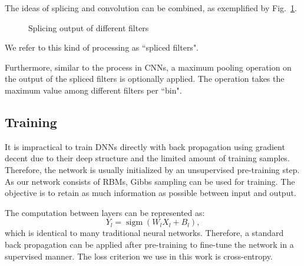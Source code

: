 \documentclass{article}
\DeclareMathOperator*{\sigm}{sigm}
\begin{document}
The ideas of splicing and convolution can be combined, as exemplified by Fig.~\ref{fig:filtersplice}.
\begin{figure}
 \centerline{}
 \caption{Splicing output of different filters}
 \label{fig:filtersplice}
\end{figure}
We refer to this kind of processing as ``spliced filters".

Furthermore, similar to the process in CNNs, a maximum pooling operation on the output of the spliced filters is optionally applied. The operation takes the maximum value among different filters per ``bin". 
 
\subsection{Training}\label{sec:train}
It is impractical to train DNNs directly with back propagation using gradient decent due to their deep structure and the limited amount of training samples. Therefore, the network is usually initialized by an unsupervised pre-training step. As our network consists of RBMs, Gibbs sampling can be used for training. The objective is to retain as much information as possible between input and output. 

The computation between layers can be represented as:
\begin{equation}\label{dbn}
Y_{l} = \sigm(W_{l}X_{l} + B_{l}) ,
\end{equation}  
which is identical to many traditional neural networks. Therefore, a standard back propagation can be applied after pre-training to fine-tune the network in a supervised manner. The loss criterion we use in this work is cross-entropy.  
\end{document}
